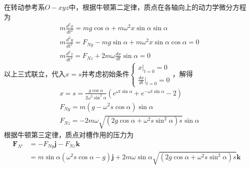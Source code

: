 \documentclass[10pt,a4paper]{article}
\theoremstyle{remark}
\begin{document}
在转动参考系$O-xyz$中，根据牛顿第二定律，质点在各轴向上的动力学微分方程为
\begin{align*}
&m\frac{d^2x}{dt^2} = mg\cos\alpha + m\omega^2 x\sin\alpha\sin\alpha\\
&m\frac{d^2y}{dt^2} = F_{Ny} - mg\sin\alpha + m\omega^2 x\sin\alpha\cos\alpha = 0\\
&m\frac{d^2z}{dt^2} = F_{Nz} + 2m\omega\frac{dx}{dt}\sin\alpha = 0
\end{align*}
以上三式联立，代入$x =s$并考虑初始条件$\left\{\begin{array}{l}x|_{t = 0} = 0\\ \frac{dx}{dt}|_{t = 0} = 0\end{array}\right.$，解得
\begin{align*}
&x = s = \frac{g\cos\alpha}{2\omega^2\sin^2\alpha}(e^{\omega t\sin\alpha} + e^{-\omega t\sin\alpha} - 2)\\
&F_{Ny} = m(g - \omega^2s\cos\alpha)\sin\alpha\\
&F_{Nz} = -2m\omega\sqrt{(2g\cos\alpha + \omega^2s\sin^2\alpha)s}\sin\alpha
\end{align*}
根据牛顿第三定律，质点对槽作用的压力为
\begin{align*}
\bm{F}_{N'} &= -F_{Ny}\bm{j} - F_{Nz}\bm{k}\\
&= m\sin\alpha(\omega^2s\cos\alpha - g)\bm{j} + 2m\omega\sin\alpha\sqrt{(2g\cos\alpha + \omega^2s\sin^2\alpha)s}\bm{k}
\end{align*}
\end{document}
